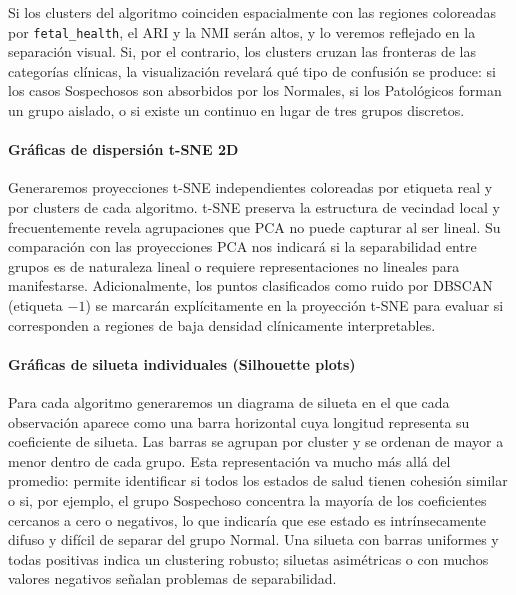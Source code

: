 \documentclass[12pt,letterpaper]{article}
\begin{document}
Si los clusters del algoritmo coinciden espacialmente con las regiones coloreadas por
\texttt{fetal\_health}, el ARI y la NMI serán altos, y lo veremos reflejado en la separación
visual. Si, por el contrario, los clusters cruzan las fronteras de las categorías clínicas, la
visualización revelará qué tipo de confusión se produce: si los casos Sospechosos son absorbidos
por los Normales, si los Patológicos forman un grupo aislado, o si existe un continuo en lugar de
tres grupos discretos.

\paragraph{Gráficas de dispersión t-SNE 2D}
Generaremos proyecciones t-SNE independientes coloreadas por etiqueta real y por clusters de cada
algoritmo. t-SNE preserva la estructura de vecindad local y frecuentemente revela agrupaciones que
PCA no puede capturar al ser lineal. Su comparación con las proyecciones PCA nos indicará si la
separabilidad entre grupos es de naturaleza lineal o requiere representaciones no lineales para
manifestarse. Adicionalmente, los puntos clasificados como ruido por DBSCAN (etiqueta $-1$) se
marcarán explícitamente en la proyección t-SNE para evaluar si corresponden a regiones de baja
densidad clínicamente interpretables.

\paragraph{Gráficas de silueta individuales (Silhouette plots)}
Para cada algoritmo generaremos un diagrama de silueta en el que cada observación aparece como una
barra horizontal cuya longitud representa su coeficiente de silueta. Las barras se agrupan por
cluster y se ordenan de mayor a menor dentro de cada grupo. Esta representación va mucho más allá
del promedio: permite identificar si todos los estados de salud tienen cohesión similar o si, por
ejemplo, el grupo Sospechoso concentra la mayoría de los coeficientes cercanos a cero o negativos,
lo que indicaría que ese estado es intrínsecamente difuso y difícil de separar del grupo Normal.
Una silueta con barras uniformes y todas positivas indica un clustering robusto; siluetas
asimétricas o con muchos valores negativos señalan problemas de separabilidad.
\end{document}
